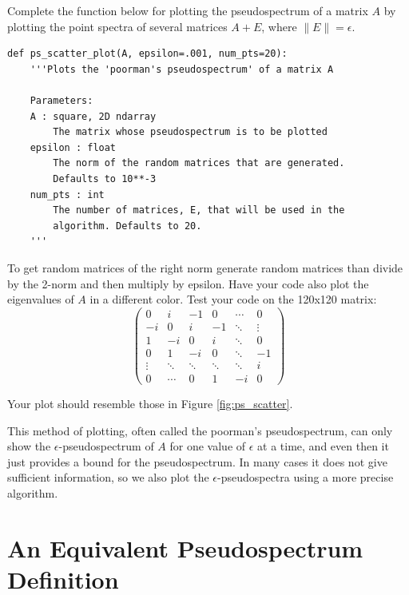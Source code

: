 \begin{problem}
Complete the function below for plotting the pseudospectrum of a matrix $A$ by plotting the point spectra of several matrices $A+E$, where $\lVert E \rVert = \epsilon$. 

\begin{lstlisting}
def ps_scatter_plot(A, epsilon=.001, num_pts=20):
    '''Plots the 'poorman's pseudospectrum' of a matrix A
    
    Parameters:
    A : square, 2D ndarray
        The matrix whose pseudospectrum is to be plotted
    epsilon : float
        The norm of the random matrices that are generated.
        Defaults to 10**-3
    num_pts : int
        The number of matrices, E, that will be used in the
        algorithm. Defaults to 20.       
    '''
\end{lstlisting}

To get random matrices of the right norm generate random matrices than divide by the 2-norm and then multiply by epsilon.
Have your code also plot the eigenvalues of $A$ in a different color. Test your code on the 120x120 matrix:
\begin{equation}
	\begin{pmatrix}
		0  &  i  &  -1  &  0  & \cdots  &  0  \\
		-i &  0  &   i  & -1 & \ddots  &  \vdots  \\
		1  & -i  &   0  &  i &\ddots&  0  \\
		0   & 1 & -i & 0 &\ddots& -1\\
		\vdots   & \ddots    & \ddots & \ddots &\ddots & i\\
		 0  &  \cdots     &   0     &    1  &   -i  & 0
		\end{pmatrix}
\end{equation}

Your plot should resemble those in Figure \ref{fig:ps_scatter}.
\end{problem}

This method of plotting, often called the poorman's pseudospectrum, can only show the $\epsilon$-pseudospectrum of $A$ for one value of $\epsilon$ at a time, and even then it just provides a bound for the pseudospectrum. In many cases it does not give sufficient information, so we also plot the $\epsilon$-pseudospectra using a more precise algorithm.

\section*{An Equivalent Pseudospectrum Definition}

